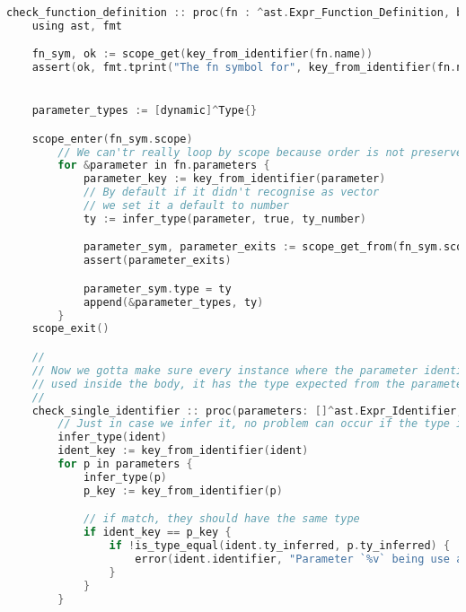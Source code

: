 \begin{codigo}[htb]
    \caption{\small Validação da definição de funções. }
    \label{cod-func-defn}
\begin{lstlisting}[language=C, inputencoding=utf8]

check_function_definition :: proc(fn : ^ast.Expr_Function_Definition, body: ^ast.Expr) {
    using ast, fmt

    fn_sym, ok := scope_get(key_from_identifier(fn.name))
    assert(ok, fmt.tprint("The fn symbol for", key_from_identifier(fn.name), " should have been set by now") )


    parameter_types := [dynamic]^Type{}

    scope_enter(fn_sym.scope)
        // We can'tr really loop by scope because order is not preserved for parameter_key, parameter in fn_sym.scope.elements {
        for &parameter in fn.parameters {
            parameter_key := key_from_identifier(parameter)
            // By default if it didn't recognise as vector
            // we set it a default to number
            ty := infer_type(parameter, true, ty_number)

            parameter_sym, parameter_exits := scope_get_from(fn_sym.scope, parameter_key)
            assert(parameter_exits)

            parameter_sym.type = ty
            append(&parameter_types, ty)
        }
    scope_exit()

    //
    // Now we gotta make sure every instance where the parameter identifier is
    // used inside the body, it has the type expected from the parameter
    //
    check_single_identifier :: proc(parameters: []^ast.Expr_Identifier, ident: ^ast.Expr_Identifier, ) {
        // Just in case we infer it, no problem can occur if the type is already set
        infer_type(ident)
        ident_key := key_from_identifier(ident)
        for p in parameters {
            infer_type(p)
            p_key := key_from_identifier(p)

            // if match, they should have the same type
            if ident_key == p_key {
                if !is_type_equal(ident.ty_inferred, p.ty_inferred) {
                    error(ident.identifier, "Parameter `%v` being use as type `%v` when the expected type is `%v`\nRemember that if you want a vector you should prefix it with `\\vec`", p_key,  format_type(ident.ty_inferred), format_type(p.ty_inferred)  )
                }
            }
        }


\end{lstlisting}
\end{codigo}
